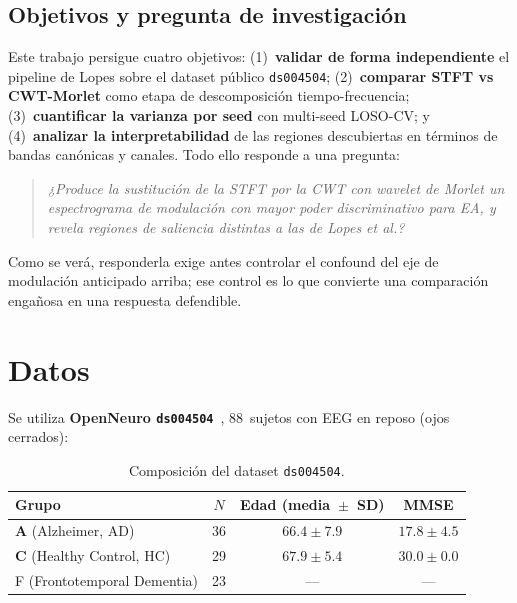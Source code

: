\documentclass[11pt, a4paper]{article}
\begin{document}
\subsection{Objetivos y pregunta de investigación}

Este trabajo persigue cuatro objetivos: (1)~\textbf{validar de forma
independiente} el pipeline de Lopes sobre el dataset público
\texttt{ds004504}; (2)~\textbf{comparar STFT vs CWT-Morlet} como etapa de
descomposición tiempo-frecuencia; (3)~\textbf{cuantificar la varianza por
seed} con multi-seed LOSO-CV; y (4)~\textbf{analizar la interpretabilidad}
de las regiones descubiertas en términos de bandas canónicas y canales.
Todo ello responde a una pregunta:

\begin{quote}
\itshape ¿Produce la sustitución de la STFT por la CWT con wavelet de
Morlet un espectrograma de modulación con mayor poder discriminativo para
EA, y revela regiones de saliencia distintas a las de Lopes et al.?
\end{quote}

\noindent Como se verá, responderla exige antes controlar el confound del
eje de modulación anticipado arriba; ese control es lo que convierte una
comparación engañosa en una respuesta defendible.

\section{Datos}
\label{sec:datos}

Se utiliza \textbf{OpenNeuro \texttt{ds004504}}~\cite{Miltiadous2023},
88~sujetos con EEG en reposo (ojos cerrados):

\begin{table}[H]
\centering
\small
\begin{tabular}{lccc}
\toprule
Grupo & $N$ & Edad (media~$\pm$~SD) & MMSE \\
\midrule
\textbf{A} (Alzheimer, AD) & 36 & $66.4 \pm 7.9$ & $17.8 \pm 4.5$ \\
\textbf{C} (Healthy Control, HC) & 29 & $67.9 \pm 5.4$ & $30.0 \pm 0.0$ \\
F (Frontotemporal Dementia) & 23 & --- & --- \\
\bottomrule
\end{tabular}
\caption{Composición del dataset \texttt{ds004504}.}
\end{table}
\end{document}
